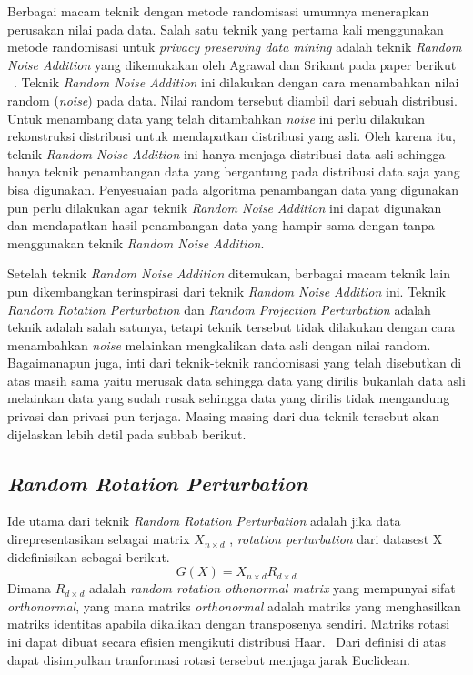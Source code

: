 Berbagai macam teknik dengan metode randomisasi umumnya menerapkan perusakan nilai pada data. Salah satu teknik yang pertama kali menggunakan metode randomisasi untuk \textit{privacy preserving data mining} adalah teknik \textit{Random Noise Addition} yang dikemukakan oleh Agrawal dan Srikant pada paper berikut ~\cite{agrawalsrikant:00:randomnoise}. Teknik \textit{Random Noise Addition} ini dilakukan dengan cara menambahkan nilai random (\textit{noise}) pada data. Nilai random tersebut diambil dari sebuah distribusi. Untuk menambang data yang telah ditambahkan \textit{noise} ini perlu dilakukan rekonstruksi distribusi untuk mendapatkan distribusi yang asli. Oleh karena itu, teknik \textit{Random Noise Addition} ini hanya menjaga distribusi data asli sehingga hanya teknik penambangan data yang bergantung pada distribusi data saja yang bisa digunakan. Penyesuaian pada algoritma penambangan data yang digunakan pun perlu dilakukan agar teknik \textit{Random Noise Addition} ini dapat digunakan dan mendapatkan hasil penambangan data yang hampir sama dengan tanpa menggunakan teknik \textit{Random Noise Addition}.

Setelah teknik \textit{Random Noise Addition} ditemukan, berbagai macam teknik lain pun dikembangkan terinspirasi dari teknik \textit{Random Noise Addition} ini. Teknik \textit{Random Rotation Perturbation} dan \textit{Random Projection Perturbation} adalah teknik adalah salah satunya, tetapi teknik tersebut tidak dilakukan dengan cara menambahkan \textit{noise} melainkan mengkalikan data asli dengan nilai random. Bagaimanapun juga, inti dari teknik-teknik randomisasi yang telah disebutkan di atas masih sama yaitu merusak data sehingga data yang dirilis bukanlah data asli melainkan data yang sudah rusak sehingga data yang dirilis tidak mengandung privasi dan privasi pun terjaga. Masing-masing dari dua teknik tersebut akan dijelaskan lebih detil pada subbab berikut.

\subsection{\textit{Random Rotation Perturbation}}
\label{subsec:rrp}

Ide utama dari teknik \textit{Random Rotation Perturbation} adalah jika data direpresentasikan sebagai matrix \(X_{n \times d}\) , \textit{rotation perturbation} dari datasest X didefinisikan sebagai berikut.
\begin{equation}
	G(X) = X_{n \times d} R_{d \times d}
\end{equation}
Dimana \(R_{d \times d}\) adalah \textit{random rotation othonormal matrix} yang mempunyai sifat \textit{orthonormal}, yang mana matriks \textit{orthonormal} adalah matriks yang menghasilkan matriks identitas apabila dikalikan dengan transposenya sendiri. Matriks rotasi ini dapat dibuat secara efisien mengikuti distribusi Haar.~\cite{stewart:80:orthogonal} Dari definisi di atas dapat disimpulkan tranformasi rotasi tersebut menjaga jarak Euclidean.~\cite{rotation:05:chenliu}

